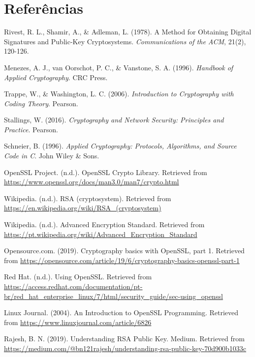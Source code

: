 \documentclass[a4paper,12pt]{article}
\begin{document}
\section*{Referências}
\begin{thebibliography}{}
    Rivest, R. L., Shamir, A., \& Adleman, L. (1978). A Method for Obtaining Digital Signatures and Public-Key Cryptosystems. \textit{Communications of the ACM}, 21(2), 120-126.
    
    Menezes, A. J., van Oorschot, P. C., \& Vanstone, S. A. (1996). \textit{Handbook of Applied Cryptography}. CRC Press.
    
    Trappe, W., \& Washington, L. C. (2006). \textit{Introduction to Cryptography with Coding Theory}. Pearson.
    
    Stallings, W. (2016). \textit{Cryptography and Network Security: Principles and Practice}. Pearson.
    
    Schneier, B. (1996). \textit{Applied Cryptography: Protocols, Algorithms, and Source Code in C}. John Wiley \& Sons.
    
    OpenSSL Project. (n.d.). OpenSSL Crypto Library. Retrieved from \url{https://www.openssl.org/docs/man3.0/man7/crypto.html}
    
    Wikipedia. (n.d.). RSA (cryptosystem). Retrieved from \url{https://en.wikipedia.org/wiki/RSA_(cryptosystem)}
    
    Wikipedia. (n.d.). Advanced Encryption Standard. Retrieved from \url{https://pt.wikipedia.org/wiki/Advanced_Encryption_Standard}
    
    Opensource.com. (2019). Cryptography basics with OpenSSL, part 1. Retrieved from \url{https://opensource.com/article/19/6/cryptography-basics-openssl-part-1}
    
    Red Hat. (n.d.). Using OpenSSL. Retrieved from \url{https://access.redhat.com/documentation/pt-br/red_hat_enterprise_linux/7/html/security_guide/sec-using_openssl}
    
    Linux Journal. (2004). An Introduction to OpenSSL Programming. Retrieved from \url{https://www.linuxjournal.com/article/6826}
    
    Rajesh, B. N. (2019). Understanding RSA Public Key. Medium. Retrieved from \url{https://medium.com/@bn121rajesh/understanding-rsa-public-key-70d900b1033c}
    \end{thebibliography}
\end{document}
